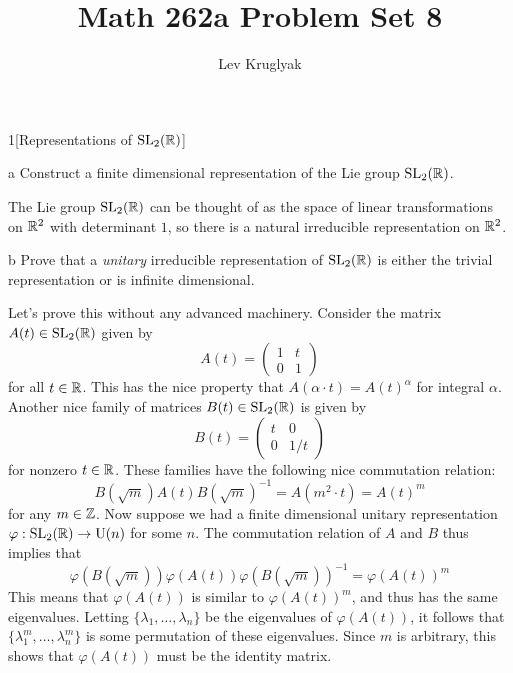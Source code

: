 \documentclass{pset}
\title{Math 262a Problem Set 8}
\author{Lev Kruglyak}
\begin{document}
\maketitle

\begin{problem}{1}[Representations of $\mathrm{SL}_2(\mathbb{R})$]
\end{problem}

\begin{parts}
  \begin{part}{a}
    Construct a finite dimensional representation of the Lie group $\mathrm{SL}_2(\mathbb{R})$.
  \end{part}

  The Lie group $\mathrm{SL}_2(\mathbb{R})$ can be thought of as the space of linear transformations on $\mathbb{R}^2$ with determinant $1$, so there is a natural irreducible representation on $\mathbb{R}^2$.

  \begin{part}{b}
    Prove that a \emph{unitary} irreducible representation of $\mathrm{SL}_2(\mathbb{R})$ is either the trivial representation or is infinite dimensional.
  \end{part}

  Let's prove this without any advanced machinery. Consider the matrix $A(t)\in \mathrm{SL}_2(\mathbb{R})$ given by
  \[
    A(t) = \begin{pmatrix}1&t\\ 0 & 1\end{pmatrix}
  \]
  for all $t\in \mathbb{R}$. This has the nice property that $A(\alpha\cdot t) = A(t)^\alpha$ for integral $\alpha$. Another nice family of matrices $B(t)\in \mathrm{SL}_2(\mathbb{R})$ is given by 
  \[
    B(t) = \begin{pmatrix}t&0\\0&1/t\end{pmatrix}
  \]
  for nonzero $t\in \mathbb{R}$. These families have the following nice commutation relation:
  \[
    B(\sqrt{m})A(t)B(\sqrt{m})^{-1} = A(m^2\cdot t) = A(t)^{m}
  \]
  for any $m\in \mathbb{Z}$. Now suppose we had a finite dimensional unitary representation $\varphi : \mathrm{SL}_2(\mathbb{R}) \to \mathrm{U}(n)$ for some $n$. The commutation relation of $A$ and $B$ thus implies that
  \[
    \varphi(B(\sqrt{m}))\varphi(A(t))\varphi(B(\sqrt{m}))^{-1} = \varphi(A(t))^{m}
  \]
  This means that $\varphi(A(t))$ is similar to $\varphi(A(t))^m$, and thus has the same eigenvalues. Letting $\{\lambda_1,\ldots, \lambda_n\}$ be the eigenvalues of $\varphi(A(t))$, it follows that $\{\lambda_1^m,\ldots, \lambda_n^m\}$ is some permutation of these eigenvalues. Since $m$ is arbitrary, this shows that $\varphi(A(t))$ must be the identity matrix.


\end{parts}
\end{document}
